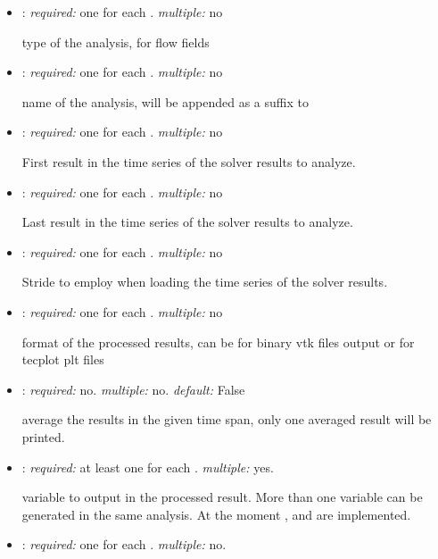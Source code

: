 \begin{itemize}
\item {}: \textit{required:} one for each . \textit{multiple:} no

type of the analysis,  for flow fields

\item {}: \textit{required:} one for each . \textit{multiple:} no

name of the analysis, will be appended as a suffix to 

\item {}: \textit{required:} one for each . \textit{multiple:} no

First result in the time series of the solver results to analyze.

\item {}: \textit{required:} one for each . \textit{multiple:} no

Last result in the time series of the solver results to analyze.

\item {}: \textit{required:} one for each . \textit{multiple:} no

Stride to employ when loading the time series of the solver results. 

\item {}: \textit{required:} one for each . \textit{multiple:} no

format of the processed results, can be  for binary vtk files output 
or  for tecplot plt files

\item {}: \textit{required:} no. \textit{multiple:} no. \textit{default:} False

average the results in the given time span, only one averaged result will be printed. 

\item {}: \textit{required:} at least one for each . 
\textit{multiple:} yes.

variable to output in the processed result. More than one variable can be generated in the same analysis. 
At the moment ,  and  are implemented.

\item {}: \textit{required:} one for each . \textit{multiple:} no.


\end{itemize}
